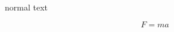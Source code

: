 \documentclass{beamer}
\begin{document}
\begin{frame}

normal text

\[
    F = ma
\]

\end{frame}
\end{document}
